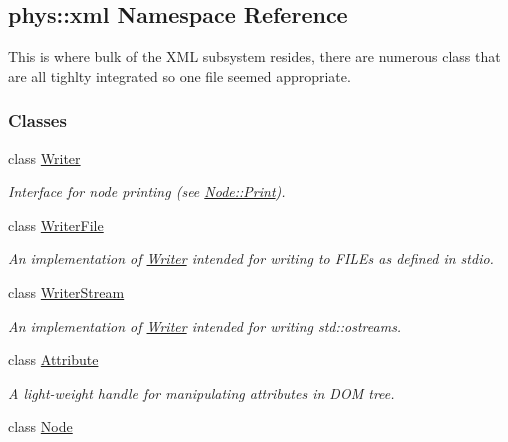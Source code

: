 \hypertarget{namespacephys_1_1xml}{
\subsection{phys::xml Namespace Reference}
\label{d9/d27/namespacephys_1_1xml}
}


This is where bulk of the XML subsystem resides, there are numerous class that are all tighlty integrated so one file seemed appropriate.  


\subsubsection*{Classes}
\begin{DoxyCompactItemize}
\item 
class \hyperlink{classphys_1_1xml_1_1Writer}{Writer}
\begin{DoxyCompactList}\small\item\em Interface for node printing (see \hyperlink{classphys_1_1xml_1_1Node_adbe10968a804a94552e1dc8223744406}{Node::Print}). \item\end{DoxyCompactList}\item 
class \hyperlink{classphys_1_1xml_1_1WriterFile}{WriterFile}
\begin{DoxyCompactList}\small\item\em An implementation of \hyperlink{classphys_1_1xml_1_1Writer}{Writer} intended for writing to FILEs as defined in stdio. \item\end{DoxyCompactList}\item 
class \hyperlink{classphys_1_1xml_1_1WriterStream}{WriterStream}
\begin{DoxyCompactList}\small\item\em An implementation of \hyperlink{classphys_1_1xml_1_1Writer}{Writer} intended for writing std::ostreams. \item\end{DoxyCompactList}\item 
class \hyperlink{classphys_1_1xml_1_1Attribute}{Attribute}
\begin{DoxyCompactList}\small\item\em A light-\/weight handle for manipulating attributes in DOM tree. \item\end{DoxyCompactList}\item 
class \hyperlink{classphys_1_1xml_1_1Node}{Node}

\end{DoxyCompactItemize}
